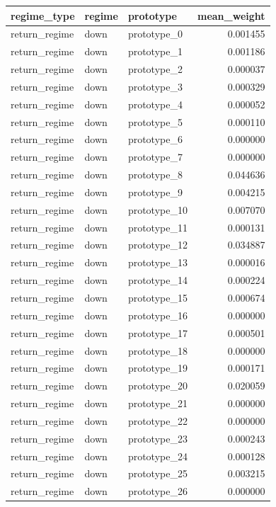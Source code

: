 \begin{tabular}{lllr}
\toprule
regime\_type & regime & prototype & mean\_weight \\
\midrule
return\_regime & down & prototype\_0 & 0.001455 \\
return\_regime & down & prototype\_1 & 0.001186 \\
return\_regime & down & prototype\_2 & 0.000037 \\
return\_regime & down & prototype\_3 & 0.000329 \\
return\_regime & down & prototype\_4 & 0.000052 \\
return\_regime & down & prototype\_5 & 0.000110 \\
return\_regime & down & prototype\_6 & 0.000000 \\
return\_regime & down & prototype\_7 & 0.000000 \\
return\_regime & down & prototype\_8 & 0.044636 \\
return\_regime & down & prototype\_9 & 0.004215 \\
return\_regime & down & prototype\_10 & 0.007070 \\
return\_regime & down & prototype\_11 & 0.000131 \\
return\_regime & down & prototype\_12 & 0.034887 \\
return\_regime & down & prototype\_13 & 0.000016 \\
return\_regime & down & prototype\_14 & 0.000224 \\
return\_regime & down & prototype\_15 & 0.000674 \\
return\_regime & down & prototype\_16 & 0.000000 \\
return\_regime & down & prototype\_17 & 0.000501 \\
return\_regime & down & prototype\_18 & 0.000000 \\
return\_regime & down & prototype\_19 & 0.000171 \\
return\_regime & down & prototype\_20 & 0.020059 \\
return\_regime & down & prototype\_21 & 0.000000 \\
return\_regime & down & prototype\_22 & 0.000000 \\
return\_regime & down & prototype\_23 & 0.000243 \\
return\_regime & down & prototype\_24 & 0.000128 \\
return\_regime & down & prototype\_25 & 0.003215 \\
return\_regime & down & prototype\_26 & 0.000000 \\

\end{tabular}
